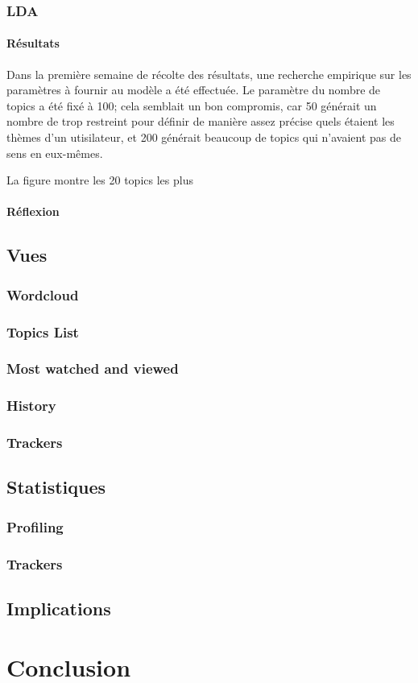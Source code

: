 		\subsubsection{LDA}

			\paragraph{Résultats}

				Dans la première semaine de récolte des résultats, une recherche empirique sur les paramètres à fournir au modèle a été effectuée. Le paramètre du nombre de topics a été fixé à 100; cela semblait un bon compromis, car 50 générait un nombre de trop restreint pour définir de manière assez précise quels étaient les thèmes d'un utisilateur, et 200 générait beaucoup de topics qui n'avaient pas de sens en eux-mêmes.

				La figure montre les 20 topics les plus 

			\paragraph{Réflexion}

	\subsection{Vues}

		\subsubsection{Wordcloud}

		\subsubsection{Topics List}

		\subsubsection{Most watched and viewed}

		\subsubsection{History}

		\subsubsection{Trackers}

	\subsection{Statistiques}

		\subsubsection{Profiling}

		\subsubsection{Trackers}

	\subsection{Implications}

\section{Conclusion}